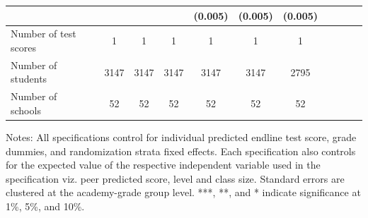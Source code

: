 \begin{center}
\begin{scriptsize}
\begin{threeparttable}
\begin{tabular} {@{} l l c c c c c c c c c c  @{}}
                 &  &  &  &  & (0.005) & (0.005) & (0.005) \\
\midrule
Number of test scores &  & 1 & 1 & 1 & 1 & 1 & 1 \\
Number of students &  & 3147 & 3147 & 3147 & 3147 & 3147 & 2795 \\
Number of schools &  & 52 & 52 & 52 & 52 & 52 & 52 \\
\bottomrule
\end{tabular}
\begin{tablenotes}
\item Notes: All specifications control for individual predicted endline test score, grade dummies, and randomization strata fixed effects. Each specification also controls for the expected value of the respective independent variable used in the specification viz. peer predicted score, level and class size. Standard errors are clustered at the academy-grade group level. ***, **, and * indicate significance at 1\%, 5\%, and 10\%.\end{tablenotes}
\end{threeparttable}
\end{scriptsize}
\end{center}
\clearpage
